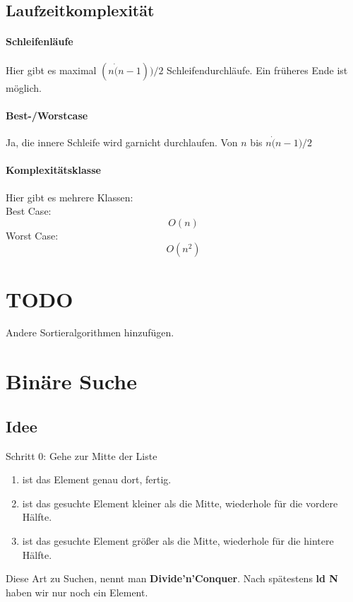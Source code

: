 \documentclass{book}
\begin{document}
\subsection{Laufzeitkomplexität}
\paragraph{Schleifenläufe} Hier gibt es maximal $(n \dot (n-1))/2$ Schleifendurchläufe. Ein früheres Ende ist möglich.
\paragraph{Best-/Worstcase} Ja, die innere Schleife wird garnicht durchlaufen. Von $n$ bis $n \dot (n-1) / 2$
\paragraph{Komplexitätsklasse} Hier gibt es mehrere Klassen: \\
Best Case:
$$O(n)$$
Worst Case:
$$O(n^2)$$
\section{TODO}
Andere Sortieralgorithmen hinzufügen.
\section{Binäre Suche}
\subsection{Idee}
Schritt 0: Gehe zur Mitte der Liste
\begin{enumerate}
	\item ist das Element genau dort, fertig.
	\item ist das gesuchte Element kleiner als die Mitte, wiederhole für die vordere Hälfte.
	\item ist das gesuchte Element größer als die Mitte, wiederhole für die hintere Hälfte.
\end{enumerate}
Diese Art zu Suchen, nennt man \textbf{Divide'n'Conquer}.
Nach spätestens \textbf{ld N} haben wir nur noch ein Element.
\end{document}
